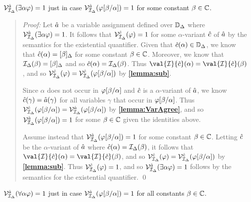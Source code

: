 \begin{Lthm} \label{lemma:FOL-exists}
  $\mathcal{V}_{\mathcal{I}_{\Delta}}^{\hat{a}}(\exists \alpha\varphi)=1$ just in case $\mathcal{V}_{\mathcal{I}_{\Delta}}^{\hat{a}}(\varphi[\beta/\alpha])=1$ for some constant $\beta\in\mathbb{C}$.
\end{Lthm}


\begin{quote} 
  \textit{Proof:}
  Let $\hat{a}$ be a variable assignment defined over $\mathbb{D}_{\Delta}$ where $\mathcal{V}_{\mathcal{I}_{\Delta}}^{\hat{a}}(\exists \alpha\varphi)=1$.
  It follows that $\mathcal{V}_{\mathcal{I}_{\Delta}}^{\hat{c}}(\varphi)=1$ for some $\alpha$-variant $\hat{c}$ of $\hat{a}$ by the semantics for the existential quantifier.
  Given that $\hat{c}(\alpha)\in\mathbb{D}_{\Delta}$, we know that $\hat{c}(\alpha)=[\beta]_{\Delta}$ for some constant $\beta\in\mathbb{C}$.
  Moreover, we know that $\mathcal{I}_{\Delta}(\beta)=[\beta]_{\Delta}$ and so $\hat{c}(\alpha)=\mathcal{I}_{\Delta}(\beta)$.
  Thus $\val{\I}{\va{c}}(\alpha)=\val{\I}{\va{c}}(\beta)$, and so $\mathcal{V}_{\mathcal{I}_{\Delta}}^{\hat{c}}(\varphi)=\mathcal{V}_{\mathcal{I}_{\Delta}}^{\hat{c}}(\varphi[\beta/\alpha])$ by \textbf{\ref{lemma:sub}}.

  Since $\alpha$ does not occur in $\varphi[\beta/\alpha]$ and $\hat{c}$ is a $\alpha$-variant of $\hat{a}$, we know $\hat{c}(\gamma) = \hat{a}(\gamma)$ for all variables $\gamma$ that occur in $\varphi[\beta/\alpha]$.
  Thus $\mathcal{V}_{\mathcal{I}_{\Delta}}^{\hat{c}}(\varphi[\beta/\alpha])=\mathcal{V}_{\mathcal{I}_{\Delta}}^{\hat{a}}(\varphi[\beta/\alpha])$ by \textbf{\ref{lemma:VarAgree}}, and so $\mathcal{V}_{\mathcal{I}_{\Delta}}^{\hat{a}}(\varphi[\beta/\alpha]) = 1$ for some $\beta\in\mathbb{C}$ given the identities above.

  Assume instead that $\mathcal{V}_{\mathcal{I}_{\Delta}}^{\hat{a}}(\varphi[\beta/\alpha])=1$ for some constant $\beta\in\mathbb{C}$.
  Letting $\hat{c}$ be the $\alpha$-variant of $\hat{a}$ where $\hat{c}(\alpha)=\mathcal{I}_{\Delta}(\beta)$, it follows that $\val{\I}{\va{c}}(\alpha)=\val{\I}{\va{c}}(\beta)$, and so $\mathcal{V}_{\mathcal{I}_{\Delta}}^{\hat{c}}(\varphi)=\mathcal{V}_{\mathcal{I}_{\Delta}}^{\hat{c}}(\varphi[\beta/\alpha])$ by \textbf{\ref{lemma:sub}}.
  Thus $\mathcal{V}_{\mathcal{I}_{\Delta}}^{\hat{c}}(\varphi)=1$, and so $\mathcal{V}_{\mathcal{I}_{\Delta}}^{\hat{a}}(\exists \alpha\varphi)=1$ follows by the semantics for the existential quantifier. 
  \qed
\end{quote}






\begin{Lthm} \label{lemma:FOL-forall}
  $\mathcal{V}_{\mathcal{I}_{\Delta}}^{\hat{a}}(\forall \alpha\varphi)=1$ just in case $\mathcal{V}_{\mathcal{I}_{\Delta}}^{\hat{a}}(\varphi[\beta/\alpha])=1$ for all constants $\beta\in\mathbb{C}$.
\end{Lthm}

